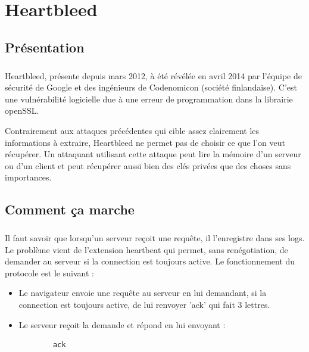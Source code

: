\chapter{Heartbleed}
\label{chapter:Heartbleed}

\section{Présentation}
\paragraph{}
Heartbleed, présente depuis mars 2012, à été révélée en avril 2014 par l'équipe de sécurité de Google et des ingénieurs de Codenomicon (société finlandaise). C'est une vulnérabilité logicielle due à une erreur de programmation dans la librairie openSSL.

Contrairement aux attaques précédentes qui cible assez clairement les informations à extraire, Heartbleed ne permet pas de choisir ce que l'on veut récupérer. Un attaquant utilisant cette attaque peut lire la mémoire d'un serveur ou d'un client et peut récupérer aussi bien des clés privées que des choses sans importances.

\section{Comment ça marche}
\paragraph{}
Il faut savoir que lorsqu'un serveur reçoit une requête, il l'enregistre dans ses logs.
Le problème vient de l'extension heartbeat qui permet, sans renégotiation, de demander au serveur si la connection est toujours active. Le fonctionnement du protocole est le suivant :
\begin{itemize}
  \item Le navigateur envoie une requête au serveur en lui demandant, si la connection est toujours active, de lui renvoyer 'ack' qui fait 3 lettres.
  \item Le serveur reçoit la demande et répond en lui envoyant :
  	\begin{verbatim}
		ack
	\end{verbatim}
\end{itemize}

